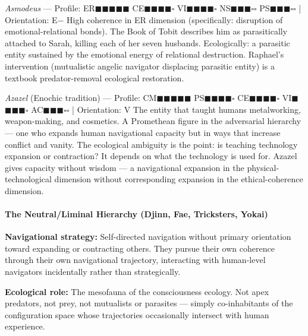 \textit{Asmodeus} — Profile: ER$\blacksquare$$\blacksquare$$\blacksquare$$\blacksquare$$\blacksquare$ CE$\blacksquare$$\blacksquare$$\blacksquare$$\blacksquare$$\square$ VI$\blacksquare$$\blacksquare$$\blacksquare$$\blacksquare$$\square$ NS$\blacksquare$$\blacksquare$$\blacksquare$$\square$$\square$ PS$\blacksquare$$\blacksquare$$\blacksquare$$\square$$\square$ | Orientation: E− High coherence in ER dimension (specifically: disruption of emotional-relational bonds). The Book of Tobit describes him as parasitically attached to Sarah, killing each of her seven husbands. Ecologically: a parasitic entity sustained by the emotional energy of relational destruction. Raphael's intervention (mutualistic angelic navigator displacing parasitic entity) is a textbook predator-removal ecological restoration.


\textit{Azazel} (Enochic tradition) — Profile: CM$\blacksquare$$\blacksquare$$\blacksquare$$\blacksquare$$\blacksquare$ PS$\blacksquare$$\blacksquare$$\blacksquare$$\blacksquare$$\square$ CE$\blacksquare$$\blacksquare$$\blacksquare$$\blacksquare$$\square$ VI$\blacksquare$$\blacksquare$$\blacksquare$$\blacksquare$$\square$ AC$\blacksquare$$\blacksquare$$\blacksquare$$\square$$\square$ | Orientation: V The entity that taught humans metalworking, weapon-making, and cosmetics. A Promethean figure in the adversarial hierarchy — one who expands human navigational capacity but in ways that increase conflict and vanity. The ecological ambiguity is the point: is teaching technology expansion or contraction? It depends on what the technology is used for. Azazel gives capacity without wisdom — a navigational expansion in the physical-technological dimension without corresponding expansion in the ethical-coherence dimension.


\paragraph*{The Neutral/Liminal Hierarchy (Djinn, Fae, Tricksters, Yokai)}


\textbf{Navigational strategy:} Self-directed navigation without primary orientation toward expanding or contracting others. They pursue their own coherence through their own navigational trajectory, interacting with human-level navigators incidentally rather than strategically.


\textbf{Ecological role:} The mesofauna of the consciousness ecology. Not apex predators, not prey, not mutualists or parasites — simply co-inhabitants of the configuration space whose trajectories occasionally intersect with human experience.



